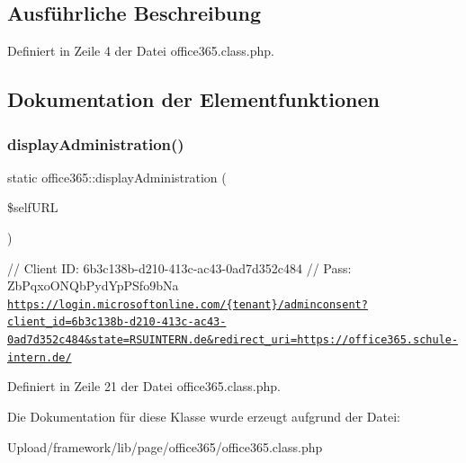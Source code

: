 \subsection{Ausführliche Beschreibung}


Definiert in Zeile 4 der Datei office365.\+class.\+php.



\subsection{Dokumentation der Elementfunktionen}
\mbox{\label{classoffice365_a5a2709af207580f72593f1c046044845}} 
\subsubsection{\texorpdfstring{display\+Administration()}{displayAdministration()}}
{\footnotesize\ttfamily static office365\+::display\+Administration (\begin{DoxyParamCaption}\item[{}]{\$self\+U\+RL }\end{DoxyParamCaption})\hspace{0.3cm}{\ttfamily [static]}}

// Client ID\+: 6b3c138b-\/d210-\/413c-\/ac43-\/0ad7d352c484 // Pass\+: Zb\+Pqxo\+O\+N\+Qb\+Pyd\+Yp\+P\+Sfo9b\+Na \href{https://login.microsoftonline.com/{tenant}/adminconsent?client_id=6b3c138b-d210-413c-ac43-0ad7d352c484&state=RSUINTERN.de&redirect_uri=https://office365.schule-intern.de/}{\tt https\+://login.\+microsoftonline.\+com/\{tenant\}/adminconsent?client\+\_\+id=6b3c138b-\/d210-\/413c-\/ac43-\/0ad7d352c484\&state=\+R\+S\+U\+I\+N\+T\+E\+R\+N.\+de\&redirect\+\_\+uri=https\+://office365.\+schule-\/intern.\+de/}

Definiert in Zeile 21 der Datei office365.\+class.\+php.



Die Dokumentation für diese Klasse wurde erzeugt aufgrund der Datei\+:\begin{DoxyCompactItemize}
\item 
Upload/framework/lib/page/office365/office365.\+class.\+php\end{DoxyCompactItemize}
